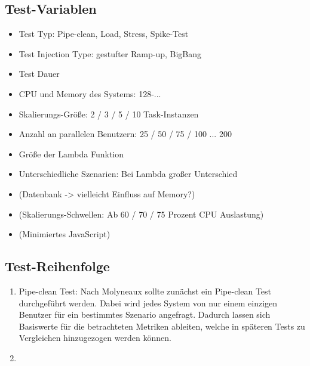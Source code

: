 \subsection{Test-Variablen}
\begin{itemize}
    \item Test Typ: Pipe-clean, Load, Stress, Spike-Test 
    \item Test Injection Type: gestufter Ramp-up, BigBang
    \item Test Dauer
    \item CPU und Memory des Systems: 128-...
    \item Skalierungs-Größe: 2 / 3 / 5 / 10 Task-Instanzen
    \item Anzahl an parallelen Benutzern: 25 / 50 / 75 / 100 ... 200
    \item Größe der Lambda Funktion
    \item Unterschiedliche Szenarien: Bei Lambda großer Unterschied 

    \item (Datenbank -> vielleicht Einfluss auf Memory?)
    \item (Skalierungs-Schwellen: Ab 60 / 70 / 75 Prozent CPU Auslastung)
    \item (Minimiertes JavaScript)
\end{itemize}

\subsection{Test-Reihenfolge}
\begin{enumerate}
    \item Pipe-clean Test: Nach Molyneaux \cite{molyneaux_art_2014} sollte zunächst ein Pipe-clean Test durchgeführt werden. Dabei wird jedes System von nur einem einzigen Benutzer für ein bestimmtes Szenario angefragt. Dadurch lassen sich Basiswerte für die betrachteten Metriken ableiten, welche in späteren Tests zu Vergleichen hinzugezogen werden können.
    \item 
\end{enumerate}
